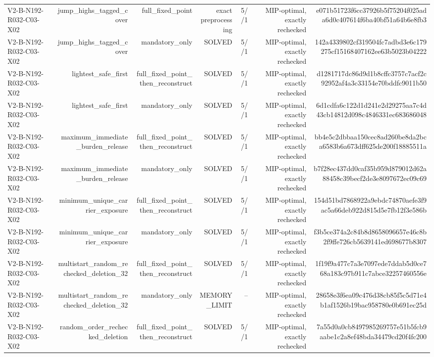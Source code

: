 {\begin{longtable}{lrrrrrr}
V2-B-N192-R032-C03-X02 & jump\_highs\_tagged\_cover & full\_fixed\_point & exact preprocessing & 5//1 & MIP-optimal, exactly rechecked & e071b51723f6cc37926b5f75204f025ada6d0c407614f6ba40bf51a64b6e8fb3 \\
V2-B-N192-R032-C03-X02 & jump\_highs\_tagged\_cover & mandatory\_only & SOLVED & 5//1 & MIP-optimal, exactly rechecked & 142a4339802cf319504fc7adbd3e6c179275cf15168407162ee63b5023b04222 \\
V2-B-N192-R032-C03-X02 & lightest\_safe\_first & full\_fixed\_point\_then\_reconstruct & SOLVED & 5//1 & MIP-optimal, exactly rechecked & d1281717dc86d9d1b8cffc3757c7acf2c92952af4a3c33154e70bddfc9011b50 \\
V2-B-N192-R032-C03-X02 & lightest\_safe\_first & mandatory\_only & SOLVED & 5//1 & MIP-optimal, exactly rechecked & 6d1cdfa6c122d1d241e2d29275aa7c4d43cb14812d098c4846331ec683686048 \\
V2-B-N192-R032-C03-X02 & maximum\_immediate\_burden\_release & full\_fixed\_point\_then\_reconstruct & SOLVED & 5//1 & MIP-optimal, exactly rechecked & bb4e5c2dbbaa150cec8ad260be8da2bca6583b6a673dff625de200f18885511a \\
V2-B-N192-R032-C03-X02 & maximum\_immediate\_burden\_release & mandatory\_only & SOLVED & 5//1 & MIP-optimal, exactly rechecked & b7f28ec437dd0caf35b959d879012d62a88458c39becf2de3e8097672ec09c69 \\
V2-B-N192-R032-C03-X02 & minimum\_unique\_carrier\_exposure & full\_fixed\_point\_then\_reconstruct & SOLVED & 5//1 & MIP-optimal, exactly rechecked & 154d51bd7868922a9ebdc74870aefe3f9ac5a66deb922d815d5e7fb12f3e586b \\
V2-B-N192-R032-C03-X02 & minimum\_unique\_carrier\_exposure & mandatory\_only & SOLVED & 5//1 & MIP-optimal, exactly rechecked & f3b5ce374a2c84b8d8658096657e46c8b2f9ffe726cb5639141ed698677b8307 \\
V2-B-N192-R032-C03-X02 & multistart\_random\_rechecked\_deletion\_32 & full\_fixed\_point\_then\_reconstruct & SOLVED & 5//1 & MIP-optimal, exactly rechecked & 1f19f9a477c7a3e7097ede7ddab5d0ce768a183c97b911c7abce32257460556e \\
V2-B-N192-R032-C03-X02 & multistart\_random\_rechecked\_deletion\_32 & mandatory\_only & MEMORY\_LIMIT & -- & MIP-optimal, exactly rechecked & 28658e3f6ea09c476d38cb85f5c5d71e4b1af1526b19bac958780e0b691ec25d \\
V2-B-N192-R032-C03-X02 & random\_order\_rechecked\_deletion & full\_fixed\_point\_then\_reconstruct & SOLVED & 5//1 & MIP-optimal, exactly rechecked & 7a55d0a0cb8497985269757e51b5fcb9aabe1c2a8ef48bda34479cd20f4fc200 \\

\end{longtable}}
